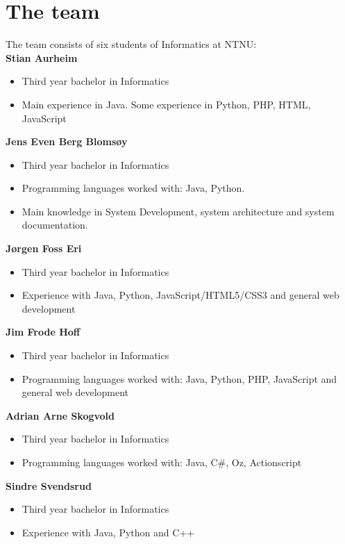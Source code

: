 \section{The team}
The team consists of six students of Informatics at NTNU:\\
\textbf{Stian Aurheim}
\begin{itemize} \setlength{\itemsep}{0cm}\setlength{\parskip}{0cm}
	\item Third year bachelor in Informatics
	\item Main experience in Java. Some experience in Python, PHP, HTML, 
		  JavaScript 
\end{itemize}
\textbf{Jens Even Berg Blomsøy}
\begin{itemize} \setlength{\itemsep}{0cm}\setlength{\parskip}{0cm}
	\item Third year bachelor in Informatics
	\item Programming languages worked with: Java, Python.
	\item Main knowledge in System Development, system architecture and 
		  system documentation.
\end{itemize}
\textbf{Jørgen Foss Eri}
\begin{itemize} \setlength{\itemsep}{0cm}\setlength{\parskip}{0cm}
	\item Third year bachelor in Informatics
	\item Experience with Java, Python, JavaScript/HTML5/CSS3 and general web development
\end{itemize}
\textbf{Jim Frode Hoff}
\begin{itemize} \setlength{\itemsep}{0cm}\setlength{\parskip}{0cm}
	\item Third year bachelor in Informatics
	\item Programming languages worked with: Java, Python, PHP, JavaScript
		  and general web development
\end{itemize}
\textbf{Adrian Arne Skogvold}
\begin{itemize} \setlength{\itemsep}{0cm}\setlength{\parskip}{0cm}
	\item Third year bachelor in Informatics
	\item Programming languages worked with: Java, C\#, Oz, Actionscript
\end{itemize}
\textbf{Sindre Svendsrud}
\begin{itemize} \setlength{\itemsep}{0cm}\setlength{\parskip}{0cm}
	\item Third year bachelor in Informatics 
	\item Experience with Java, Python and C++
\end{itemize}

